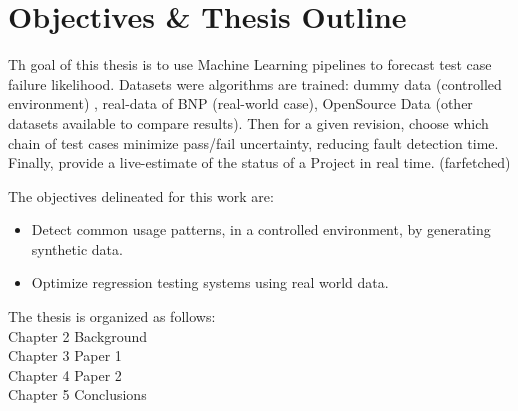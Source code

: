 \section{Objectives \& Thesis Outline}
\label{section:objectives}
Th goal of this thesis is to use Machine Learning pipelines to forecast test case failure likelihood.  
Datasets were algorithms are trained: dummy data (controlled environment) , real-data of BNP (real-world case), OpenSource Data (other datasets available to compare results).
Then for a given revision, choose which chain of test cases minimize pass/fail uncertainty, reducing fault detection time.
Finally, provide a live-estimate of the status of a Project in real time. (farfetched)



The objectives delineated for this work are: 
\begin{itemize}
	\item Detect common usage patterns, in a controlled environment, by generating synthetic data.
	\item Optimize regression testing systems using real world data.
\end{itemize}


The thesis is organized as follows: \\
Chapter 2 Background  \\
Chapter 3 Paper 1 \\
Chapter 4 Paper 2 \\
Chapter 5 Conclusions \\  



